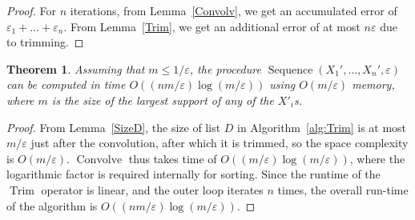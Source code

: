 \documentclass[review]{elsarticle}
\newtheorem{theorem}{Theorem}
\DeclareMathOperator{\Trim}{Trim}
\DeclareMathOperator{\Sequence}{Sequence}
\begin{document}
\begin{proof} For $n$ iterations, from Lemma~\ref{Convolv}, we get an accumulated error of 
$\varepsilon_1 +\dots+ \varepsilon_n$. From Lemma~\ref{Trim}, we get an additional error of at most $n\varepsilon$ due to trimming. 
\end{proof}


\begin{theorem} \label{appSeqComplexTheorem}
Assuming that $m \leq 1/\varepsilon$, the procedure
$\Sequence(X_1',\dots,X_n', \varepsilon)$ can be computed
in time $O((nm/\varepsilon)\log(m/\varepsilon))$ using $O(m/\varepsilon)$ memory, where $m$ is the size of the largest support of any of the $X'_i$s.
\end{theorem} 

\begin{proof}
From Lemma~\ref{SizeD}, the size of list $D$ in 
Algorithm~\ref{alg:Trim} is at most $m/\varepsilon$
just after the convolution, after which it is trimmed, so the space complexity 
is $O(m/\varepsilon)$.
$\operatorname{Convolve}$ thus takes time of $O((m/\varepsilon)\log(m/\varepsilon))$, where the logarithmic factor
is required internally
for sorting. Since the runtime of  the $\Trim$ operator is linear, and the
outer loop iterates $n$ times, the overall 
run-time of the algorithm is $O((n m/\varepsilon) \log(m/\varepsilon))$.
\end{proof}



\end{document}
